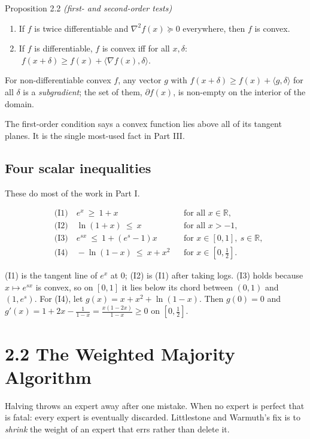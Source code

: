 \documentclass[11pt,a4paper,openany]{book}
\newcommand{\R}{\mathbb{R}}
\newcommand{\ip}[2]{\langle #1,#2\rangle}
\begin{document}
\begin{bthm}{Proposition 2.2 \emph{(first- and second-order tests)}}
\begin{enumerate}
\item If $f$ is twice differentiable and $\nabla^2 f(x)\succeq 0$ everywhere, then $f$ is convex.
\item If $f$ is differentiable, $f$ is convex iff for all $x,\delta$: $\;f(x+\delta)\ge f(x)+\ip{\nabla f(x)}{\delta}$.
\end{enumerate}

For non-differentiable convex $f$, any vector $g$ with $f(x+\delta)\ge f(x)+\ip{g}{\delta}$ for all $\delta$ is a \emph{subgradient}; the set of them, $\partial f(x)$, is non-empty on the interior of the domain.
\end{bthm}

The first-order condition says a convex function lies above all of its tangent planes. It is the single most-used fact in Part III.

\subsection*{Four scalar inequalities}

These do most of the work in Part I.

\[\begin{aligned}
&\text{(I1)}\quad e^{x}\ \ge\ 1+x &&\text{for all } x\in\R,\\
&\text{(I2)}\quad \ln(1+x)\ \le\ x &&\text{for all } x>-1,\\
&\text{(I3)}\quad e^{sx}\ \le\ 1+(e^{s}-1)x &&\text{for } x\in[0,1],\ s\in\R,\\
&\text{(I4)}\quad -\ln(1-x)\ \le\ x+x^{2} &&\text{for } x\in[0,\tfrac12].
\end{aligned}\]

(I1) is the tangent line of $e^x$ at $0$; (I2) is (I1) after taking logs. (I3) holds because $x\mapsto e^{sx}$ is convex, so on $[0,1]$ it lies below its chord between $(0,1)$ and $(1,e^s)$. For (I4), let $g(x)=x+x^2+\ln(1-x)$. Then $g(0)=0$ and $g'(x)=1+2x-\frac1{1-x}=\frac{x(1-2x)}{1-x}\ge0$ on $[0,\tfrac12]$.

\section*{2.2 The Weighted Majority Algorithm}\label{ch2-wma}

Halving throws an expert away after one mistake. When no expert is perfect that is fatal: every expert is eventually discarded. Littlestone and Warmuth's fix is to \emph{shrink} the weight of an expert that errs rather than delete it.
\end{document}
